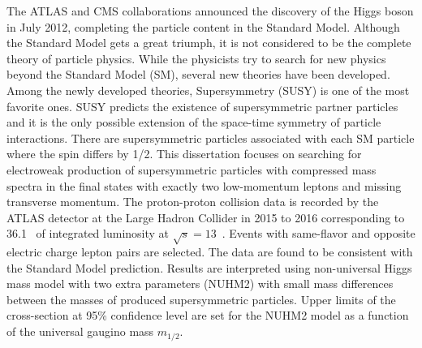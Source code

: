 The ATLAS and CMS collaborations announced the discovery of the Higgs boson in July 2012, completing the particle content in the Standard Model.
Although the Standard Model gets a great triumph, it is not considered to be the complete theory of particle physics.
While the physicists try to search for new physics beyond the Standard Model (SM), several new theories have been developed.
Among the newly developed theories, Supersymmetry (SUSY) is one of the most favorite ones.
SUSY predicts the existence of supersymmetric partner particles and it is the only possible extension of the space-time symmetry of particle interactions.
There are supersymmetric particles associated with each SM particle where the spin differs by 1/2.
This dissertation focuses on searching for electroweak production of supersymmetric particles with compressed mass spectra in the final states with exactly two low-momentum leptons and missing transverse momentum.
The proton-proton collision data is recorded by the ATLAS detector at the Large Hadron Collider in 2015 to 2016 corresponding to 36.1~{\ifb} of integrated luminosity at $\sqrt{s} = 13$~{\TeV}.
Events with same-flavor and opposite electric charge lepton pairs are selected.
The data are found to be consistent with the Standard Model prediction.
Results are interpreted using non-universal Higgs mass model with two extra parameters (NUHM2) with small mass differences between the masses of produced supersymmetric particles.
Upper limits of the cross-section at 95\% confidence level are set for the NUHM2 model as a function of the universal gaugino mass $m_{1/2}$.
